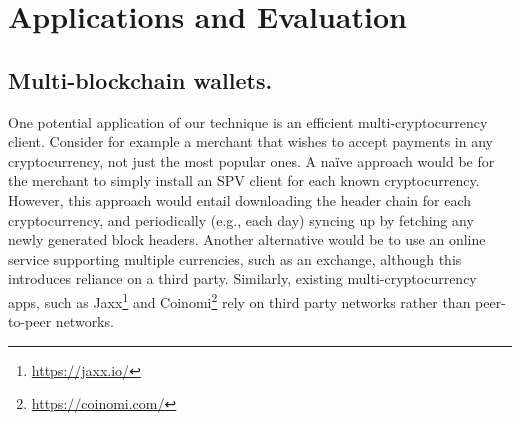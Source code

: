\section{Applications and Evaluation}




\subsection{Multi-blockchain wallets.}

One potential application of our technique is an efficient multi-cryptocurrency client.
Consider for example a merchant that wishes to accept payments in any cryptocurrency, not just the most popular ones.
A na\"ive approach would be for the merchant to simply install an SPV client for each known cryptocurrency. However, this approach would entail downloading the header chain for each cryptocurrency, and periodically (e.g., each day) syncing up by fetching any newly generated block headers.
Another alternative would be to use an online service supporting multiple currencies, such as an exchange, although this introduces reliance on a third party. Similarly, existing multi-cryptocurrency apps, such as Jaxx\footnote{\url{https://jaxx.io/}} and Coinomi\footnote{\url{https://coinomi.com/}} rely on third party networks rather than peer-to-peer networks.

